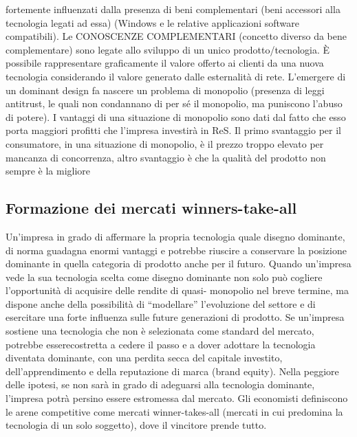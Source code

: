 \documentclass{article}
\begin{document}
\begin{enumerate}
\begin{itemize}
		fortemente influenzati dalla presenza di beni complementari (beni accessori alla tecnologia
		legati ad essa) (Windows e le relative applicazioni software compatibili).
		Le CONOSCENZE COMPLEMENTARI (concetto diverso da bene complementare) sono legate
		allo sviluppo di un unico prodotto/tecnologia.
		È possibile rappresentare graficamente il valore offerto ai clienti da una nuova tecnologia
		considerando il valore generato dalle esternalità di rete.
		L’emergere di un dominant design fa nascere un problema di monopolio (presenza di leggi
		antitrust, le quali non condannano di per sé il monopolio, ma puniscono l’abuso di potere).
		I vantaggi di una situazione di monopolio sono dati dal fatto che esso porta maggiori profitti
		che l’impresa investirà in ReS.
		Il primo svantaggio per il consumatore, in una situazione di monopolio, è il prezzo troppo
		elevato per mancanza di concorrenza, altro svantaggio è che la qualità del prodotto non sempre è la migliore
	\end{itemize}
\end{enumerate}

\subsection{Formazione dei mercati winners-take-all}
Un’impresa in grado di affermare la propria tecnologia quale disegno dominante, di norma
guadagna enormi vantaggi e potrebbe riuscire a conservare la posizione dominante in quella
categoria di prodotto anche per il futuro. Quando un’impresa vede la sua tecnologia scelta come
disegno dominante non solo può cogliere l’opportunità di acquisire delle rendite di quasi-
monopolio nel breve termine, ma dispone anche della possibilità di “modellare” l’evoluzione del
settore e di esercitare una forte influenza sulle future generazioni di prodotto. Se un’impresa
sostiene una tecnologia che non è selezionata come standard del mercato, potrebbe esserecostretta a cedere il passo e a dover adottare la tecnologia diventata dominante, con una perdita
secca del capitale investito, dell’apprendimento e della reputazione di marca (brand equity). Nella
peggiore delle ipotesi, se non sarà in grado di adeguarsi alla tecnologia dominante, l’impresa potrà
persino essere estromessa dal mercato.
Gli economisti definiscono le arene competitive come mercati winner-takes-all (mercati in cui
predomina la tecnologia di un solo soggetto), dove il vincitore prende tutto.
\end{document}
